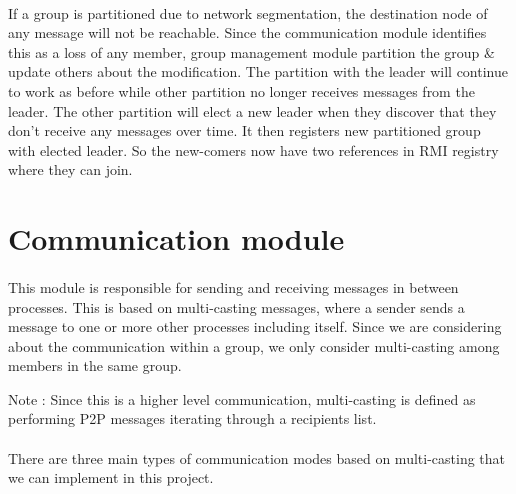 \documentclass[a4paper,english,twoside]{article}
\begin{document}
\paragraph{}
If a group is partitioned due to network segmentation, the destination node of any message will not be reachable. Since the communication module identifies this as a loss of any member, group management module partition the group \& update others about the modification. The partition with the leader will continue to work as before while other partition no longer receives messages from the leader. The other partition will elect a new leader when they discover that they don't receive any messages over time. It then registers new partitioned group with elected leader. So the new-comers now have two references in RMI registry where they can join.  

\section{Communication module}
\paragraph{}
This module is responsible for sending and receiving messages in between processes. This is based on multi-casting messages, where a sender sends a message to one or more other processes including itself. Since we are considering about the communication within a group, we only consider multi-casting among members in the same group.

\vspace{5mm}
\noindent
Note : Since this is a higher level communication, multi-casting is defined as performing P2P messages iterating through a recipients list.

\paragraph{}
There are three main types of communication modes based on multi-casting that we can implement in this project.
\end{document}
